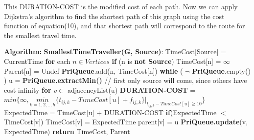 \documentclass{article}
\newcommand\algo{\vspace{.10in}\textbf{Algorithm: }}
\begin{document}
 This DURATION-COST is the modified cost of each path. Now we can apply Dijkstra's algorithm to find the shortest path of this graph using the cost function of equation(10), and that shortest path will correspond to the route for the smallest travel time. \newline

 \algo \newline
 \textbf {SmallestTimeTraveller(G, Source)}: \newline
 \hspace*{0.5cm} TimeCost[Source] = CurrentTime \newline
 \hspace*{0.5cm} \textbf {for} each $n \in Vertices$ \newline
 \hspace*{1.0cm} 	\textbf {if} (n is \textbf {not Source}) \newline
 \hspace*{1.5cm} 		TimeCost[n] = $\infty$ \newline
 \hspace*{1.5cm} 		Parent[n]   = Undef \newline
 \hspace*{1.0cm} 	\textbf {PriQueue}.add(n, TimeCost[n]) \newline
 \hspace*{0.5cm} \textbf {while} ( $\neg$ \textbf {PriQueue}.empty() ) \newline
 \hspace*{1.0cm} 	u = \textbf {PriQueue.extractMin()} // first only source will come, since others have cost infinity \newline
 \hspace*{1.0cm} 	\textbf {for} $v \in$ adjacencyList(u) \newline
 \hspace*{1.5cm} 		\textbf {DURATION-COST} = $ min \bigg \{ \infty, \underset{k=1,2,..,h}{min}{\{t_{ij,k} - TimeCost[u] + f_{ij,k}\}\bigg |_{t_{ij,k}-TimeCost[u] \geq 10}}  \bigg \}$ \newline
 \hspace*{1.5cm}		ExpectedTime = TimeCost[u] + DURATION-COST \newline
 \hspace*{1.5cm}		\textbf {if}(ExpectedTime $<$ TimeCost[v]) \newline
 \hspace*{2.0cm}			TimeCost[v] = ExpectedTime \newline
 \hspace*{2.0cm}			parent[v]   = u \newline
 \hspace*{2.0cm}			\textbf {PriQueue.update}(v, ExpectedTime) \newline
 \hspace*{0.5cm} \textbf {return} TimeCost, Parent \newline
 \newline
\end{document}
